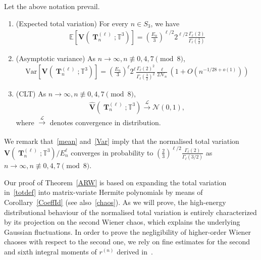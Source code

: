 \documentclass[AHL,Unicode,longabstracts,published]{cedram}
\DeclareMathOperator{\bT}{\mathbf{T}}
\newcommand{\scN}{\mathscr{N}}
\newcommand{\bfv}{\mathbf{V}}
\newcommand{\T}{\mathbb{T}^3}
\newcommand{\E}[1]{\mathbb{E}\left[#1\right]}
\newcommand{\V}[1]{\mathrm{Var}{\left[#1\right]}}
\newcommand{\Law}{\xrightarrow[]{\mathcal{L}} }
\newcommand{\notcon}[3]{ {#1} \not\equiv {#2} \pmod {#3} }
\newcommand{\Nn}{\mathcal{N}_n}
\newcommand*{\romanenumi}{\renewcommand*{\theenumi}{\roman{enumi}}}
\begin{document}
\begin{theo}\label{ARW}
Let the above notation prevail.
\begin{enumerate}\romanenumi
\item (Expected total variation) For every $n \in S_3$, we have
\begin{gather}\label{mean}
\E{\bfv\left(\bT_n^{(\ell)};\T\right)} =
\left(\frac{E_n}{3}\right)^{\ell/2} 2^{\ell/2}\frac{\Gamma_{\ell}(2)}{\Gamma_{\ell}\left(\frac{3}{2}\right)}
\end{gather}
\item (Asymptotic variance) As $n\to \infty, \notcon{n}{0,4,7}{8}$,
\begin{gather}\label{Var}
\V{\bfv\left(\bT_n^{(\ell)};\T\right)} =
\left(\frac{E_n}{3}\right)^{\ell} 2^{\ell} \frac{\Gamma_{\ell}(2)^2}{\Gamma_{\ell}\left(\frac{3}{2}\right)^2}
\frac{\ell}{2\Nn}\left(1 + O\left(n^{-1/28+o(1)}\right)\right)
\end{gather}
\item (CLT) As $n\to \infty, \notcon{n}{0,4,7}{8}$,
\begin{gather}\label{CLT}
\widehat{\bfv}\left(\bT_n^{(\ell)};\T\right) \Law \scN(0,1),
\end{gather}
where $\Law$ denotes convergence in distribution.
\end{enumerate}
\end{theo}



We remark that~\eqref{mean} and~\eqref{Var} imply that the normalised total variation $\bfv(\bT_n^{(\ell)};\T)/E_n^{\ell}$ converges in probability to $(\frac{2}{3})^{\ell/2}\frac{\Gamma_{\ell}(2)}{\Gamma_{\ell}(3/2)}$ as $n\to \infty,\notcon{n}{0,4,7}{8}$.

Our proof of Theorem~\ref{ARW} is based on expanding the total variation in~\eqref{totdef} into matrix-variate Hermite polynomials by means of Corollary~\ref{CoeffId} (see also~\eqref{chaos}). As we will prove, the high-energy distributional behaviour of the normalised total variation is entirely characterized by its projection on the second Wiener chaos, which explains the underlying Gaussian fluctuations. In order to prove the negligibility of higher-order Wiener chaoses with respect to the second one, we rely on fine estimates for the second and sixth integral moments of $r^{(n)}$ derived in~\cite{BM17}.
\end{document}
